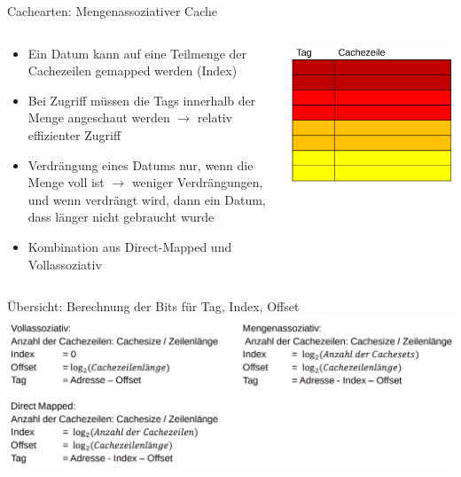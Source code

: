 \documentclass[
  german,            %
  aspectratio=169,    %
]{tumbeamer}
\begin{document}
\begin{frame}[c]{Cachearten: Mengenassoziativer Cache}{}
  \begin{columns}[c]
    \begin{column}{0.5\textwidth}
      \begin{itemize}
        \item Ein Datum kann auf eine Teilmenge der Cachezeilen gemapped werden (Index) 
        \item Bei Zugriff müssen die Tags innerhalb der Menge angeschaut werden $\rightarrow$ relativ effizienter Zugriff 
        \item Verdrängung eines Datums nur, wenn die Menge voll ist $\rightarrow$  weniger Verdrängungen, und wenn verdrängt wird, dann ein Datum, dass länger nicht gebraucht wurde
        \item Kombination aus Direct-Mapped und Vollassoziativ
      \end{itemize}
    \end{column}
    \begin{column}{0.5\textwidth}
      \includegraphics[width=\linewidth]{w05_mengenassoz_rep.png}
    \end{column}
  \end{columns}
\end{frame}

\begin{frame}[c]{Übersicht: Berechnung der Bits für Tag, Index, Offset}{}
  \includegraphics[width=\linewidth]{w05_berechnung_der_bits_rep.png}
\end{frame}
\end{document}
